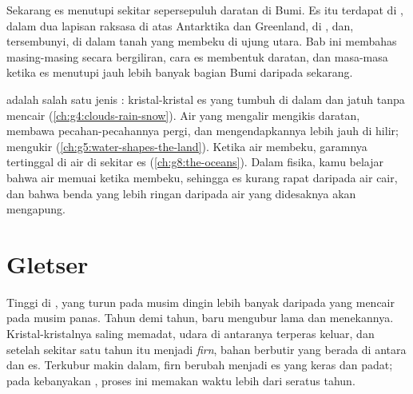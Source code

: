 Sekarang es menutupi sekitar sepersepuluh daratan di Bumi. Es itu terdapat
di  , dalam dua lapisan raksasa di atas Antarktika
dan Greenland, di  , dan, tersembunyi, di dalam tanah yang
membeku di ujung utara. Bab ini membahas masing-masing secara bergiliran,
cara es membentuk daratan, dan masa-masa ketika es menutupi jauh lebih
banyak bagian Bumi daripada sekarang.

\begin{recall}
 adalah salah satu jenis : kristal-kristal es yang tumbuh
di dalam  dan jatuh tanpa mencair (\cref{ch:g4:clouds-rain-snow}). Air
yang mengalir mengikis daratan, membawa pecahan-pecahannya pergi, dan
mengendapkannya lebih jauh di hilir;  mengukir 
(\cref{ch:g5:water-shapes-the-land}). Ketika air  membeku, garamnya
tertinggal di air di sekitar es (\cref{ch:g8:the-oceans}). Dalam fisika,
kamu belajar bahwa air memuai ketika membeku, sehingga es kurang rapat
daripada air cair, dan bahwa benda yang lebih ringan daripada air yang
didesaknya akan mengapung.
\end{recall}

\section{Gletser}

Tinggi di ,  yang turun pada musim dingin lebih banyak
daripada yang mencair pada musim panas. Tahun demi tahun,  baru
mengubur  lama dan menekannya. Kristal-kristalnya saling memadat,
udara di antaranya terperas keluar, dan setelah sekitar satu tahun 
itu menjadi \emph{firn}, bahan berbutir yang berada di antara  dan
es. Terkubur makin dalam, firn berubah menjadi es yang keras dan padat;
pada kebanyakan , proses ini memakan waktu lebih dari seratus
tahun.

